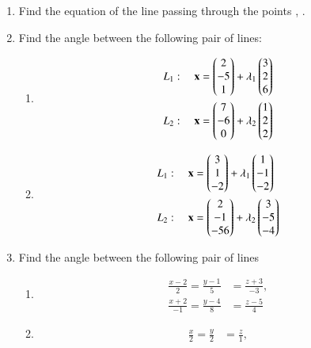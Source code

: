 \begin{enumerate}[label=\arabic*.,ref=\thesubsection.\theenumi]
\\
\solution

\item Find the equation of the line passing through the points , .
\\
\solution

\item Find the angle between the following pair of lines:
\begin{enumerate}
\item
\begin{align}
L_1: \quad \mathbf{x} &= \begin{pmatrix}2\\-5\\1\end{pmatrix} + \lambda_1\begin{pmatrix}3 \\ 2 \\6\end{pmatrix}
\\
L_2: \quad \mathbf{x} &= \begin{pmatrix}7\\-6\\0\end{pmatrix} + \lambda_2\begin{pmatrix}1 \\ 2 \\2\end{pmatrix}
\end{align}
\item
\begin{align}
L_1: \quad \mathbf{x} &= \begin{pmatrix}3\\1\\-2\end{pmatrix} + \lambda_1\begin{pmatrix}1 \\ -1 \\-2\end{pmatrix}
\\
L_2: \quad \mathbf{x} &= \begin{pmatrix}2\\-1\\-56\end{pmatrix} + \lambda_2\begin{pmatrix}3 \\ -5 \\-4\end{pmatrix}
\end{align}
\end{enumerate}
\item Find the angle between the following pair of lines
\begin{enumerate}
\item 
\begin{align}
\frac{x-2}{2} = \frac{y-1}{5} &= \frac{z+3}{-3}, 
\\
\frac{x+2}{-1} = \frac{y-4}{8} &= \frac{z-5}{4} 
\end{align}
\item 
\begin{align}
\frac{x}{2} = \frac{y}{2} &= \frac{z}{1}, 

\end{align}
\end{enumerate}
\end{enumerate}
